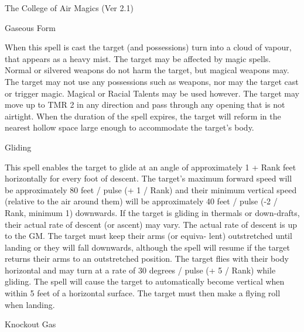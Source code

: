 \begin{Chapter}{The College of Air Magics (Ver 2.1)}
\begin{spell}[S-7]{Gaseous Form}

\begin{effects}
When this spell is cast the target (and possessions) turn into a cloud
of vapour, that appears as a heavy mist.  The target may be affected
by magic spells.  Normal or silvered weapons do not harm the target,
but magical weapons may. The target may not use any possessions such
as weapons, nor may the target cast or trigger magic.  Magical or
Racial Talents may be used however.  The target may move up to TMR 2
in any direction and pass through any opening that is not airtight.
When the duration of the spell expires, the target will reform in the
nearest hollow space large enough to accommodate the target’s body.
\end{effects}
\end{spell}

\begin{spell}[S-8]{Gliding}

\begin{effects}
This spell enables the target to glide at an angle of approximately 1
+ Rank feet horizontally for every foot of descent.  The target’s
maximum forward speed will be approximately 80 feet / pulse (+ 1 /
Rank) and their minimum vertical speed (relative to the air around
them) will be approximately 40 feet / pulse (-2 / Rank, minimum 1)
downwards.  If the target is gliding in thermals or down-drafts, their
actual rate of descent (or ascent) may vary.  The actual rate of
descent is up to the GM.  The target must keep their arms (or equiva-
lent) outstretched until landing or they will fall downwards, although
the spell will resume if the target returns their arms to an
outstretched position.  The target flies with their body horizontal
and may turn at a rate of 30 degrees / pulse (+ 5 / Rank) while
gliding.  The spell will cause the target to automatically become
vertical when within 5 feet of a horizontal surface. The target must
then make a flying roll when landing.
\end{effects}
\end{spell}

\begin{spell}[S-9]{Knockout Gas}


\end{spell}
\end{Chapter}

